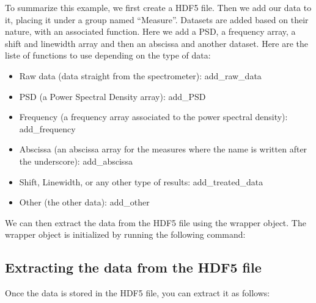\documentclass[letterpaper,10pt,english]{sphinxmanual}
\begin{document}
\sphinxAtStartPar
To summarize this example, we first create a HDF5 file. Then we add our data to it, placing it under a group named “Measure”. Datasets are added based on their nature, with an associated function. Here we add a PSD, a frequency array, a shift and linewidth array and then an abscissa and another dataset. Here are the liste of functions to use depending on the type of data:
\begin{itemize}
\item {} 
\sphinxAtStartPar
Raw data (data straight from the spectrometer): add\_raw\_data

\item {} 
\sphinxAtStartPar
PSD (a Power Spectral Density array): add\_PSD

\item {} 
\sphinxAtStartPar
Frequency (a frequency array associated to the power spectral density): add\_frequency

\item {} 
\sphinxAtStartPar
Abscissa (an abscissa array for the measures where the name is written after the underscore): add\_abscissa

\item {} 
\sphinxAtStartPar
Shift, Linewidth, or any other type of results: add\_treated\_data

\item {} 
\sphinxAtStartPar
Other (the other data): add\_other

\end{itemize}

\sphinxAtStartPar
We can then extract the data from the HDF5 file using the wrapper object. The wrapper object is initialized by running the following command:

\begin{sphinxVerbatim}[commandchars=\\\{\}]
  
\end{sphinxVerbatim}


\subsection{Extracting the data from the HDF5 file}
\label{\detokenize{source/quickstart:extracting-the-data-from-the-hdf5-file}}
\sphinxAtStartPar
Once the data is stored in the HDF5 file, you can extract it as follows:

\begin{sphinxVerbatim}[commandchars=\\\{\}]

    

  \PYG{p}{[}\PYG{p}{]}
\end{sphinxVerbatim}
\end{document}
